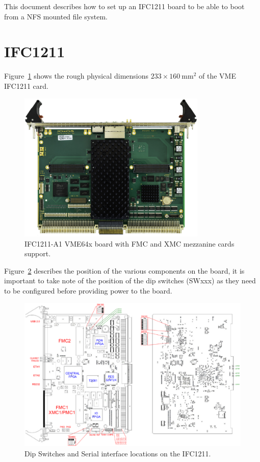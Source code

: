 \documentclass[11pt
  , a4paper
  , article
  , oneside
  , showtrims
]{memoir}
\begin{document}
This document describes how to set up an IFC1211 board to be able to boot from a NFS mounted file system.

\section{IFC1211}
Figure~\ref{fig:ifc1211_dim} shows the rough physical dimensions $233\times 160~\mathrm{mm}{}^2$ of the VME IFC1211 card.

\begin{figure}[!htb]
  \centering
  \includegraphics[width=0.80\textwidth]{./pictures/IOxOS_IFC1211.eps}
  \caption{
    IFC1211-A1 VME64x board with FMC and XMC mezzanine cards support.
  }
  \label{fig:ifc1211_dim}   
\end{figure}

Figure~\ref{fig:ser_ifc_con} describes the position of the various components on the board, it is important to take note of the position of the dip switches (SWxxx) as they need to be configured before providing power to the board.

\begin{figure}[!htb]
	\centering
	\hspace*{-2.5cm}
	\includegraphics[width=1.4\textwidth]{./pictures/ser_ifc_con.eps}
	\caption{
		Dip Switches and Serial interface locations on the IFC1211.
	}
	\label{fig:ser_ifc_con}
\end{figure}
\end{document}
